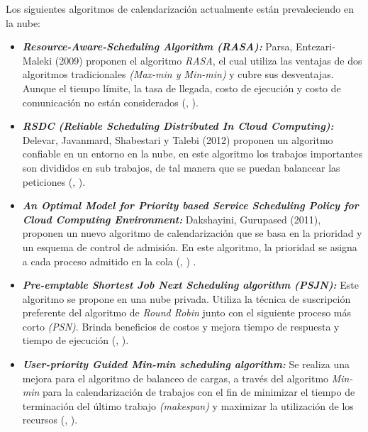 Los siguientes algoritmos de calendarizaci\'on actualmente est\'an prevaleciendo en la nube:
\begin{itemize}
	\item \textit{\textbf{Resource-Aware-Scheduling Algorithm (RASA):}} Parsa, Entezari-Maleki (2009) proponen el algoritmo \textit{RASA}, el cual utiliza las ventajas de dos algoritmos tradicionales \textit{(Max-min y Min-min)} y cubre sus desventajas. Aunque el tiempo l\'imite, la tasa de llegada, costo de ejecución y costo de comunicaci\'on no est\'an considerados (\citeauthor{parsa2009rasa}, \citeyear{parsa2009rasa}).
	
	
	\item \textit{\textbf{RSDC (Reliable Scheduling Distributed In Cloud Computing):}} Delevar, Javanmard, Shabestari y Talebi (2012) proponen un algoritmo confiable en un entorno en la nube, en este algoritmo los trabajos importantes son divididos en sub trabajos, de tal manera que se puedan balancear las peticiones (\citeauthor{delavar2012rsdc}, \citeyear{delavar2012rsdc}).
	
	
	\item \textit{\textbf{An Optimal Model for Priority based Service Scheduling Policy for Cloud Computing Environment:}} Dakshayini, Gurupased (2011), proponen un nuevo algoritmo de calendarizaci\'on que se basa en la prioridad y un esquema de control de admisi\'on. En este algoritmo, la prioridad se asigna a cada proceso admitido en la cola (\citeauthor{dakshayini2011optimal}, \citeyear{dakshayini2011optimal}) . 
	
	
	\item \textit{\textbf{Pre-emptable Shortest Job Next Scheduling algorithm (PSJN):}}  Este algoritmo se propone en una nube privada. Utiliza la t\'ecnica de suscripci\'on preferente del algoritmo de \textit{Round Robin} junto con el siguiente proceso m\'as corto \textit{(PSN)}. Brinda beneficios de costos y mejora tiempo de respuesta y tiempo de ejecuci\'on (\citeauthor{nishant}, \citeyear{nishant}). 
	
	
	\item \textit{\textbf{User-priority Guided Min-min scheduling algorithm:}} Se realiza una mejora para el algoritmo de balanceo de cargas, a trav\'es del algoritmo \textit{Min-min} para la calendarizaci\'on de trabajos con el fin de minimizar el tiempo de terminaci\'on del \'ultimo trabajo \textit{(makespan)} y maximizar la utilizaci\'on de los recursos (\citeauthor{chen2013user}, \citeyear{chen2013user}). 
\end{itemize}



